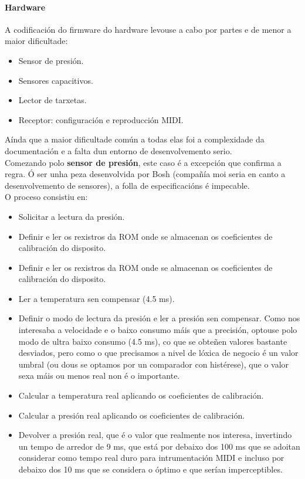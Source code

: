    \paragraph{Hardware}
   
   A codificación do firmware do hardware levouse a cabo por partes e de menor
   a maior dificultade:
   
   \begin{itemize}
    \item Sensor de presión.
    \item Sensores capacitivos.
    \item Lector de tarxetas.
    \item Receptor: configuración e reproducción MIDI.
   \end{itemize}
   
   Aínda que a maior dificultade común a todas elas foi a complexidade da
   documentación e a falta dun entorno de desenvolvemento serio. \\
   
   Comezando polo \textbf{sensor de presión}, este caso é a excepción que 
   confirma a regra. Ó ser unha peza desenvolvida por Bosh (compañía moi seria
   en canto a desenvolvemento de sensores), a folla de especificacións
   \cite{BMP085} é impecable. \\
   
    O proceso consistiu en:
    
    \begin{itemize}
    \item Solicitar a lectura da presión.
    \item Definir e ler os rexistros da ROM onde se almacenan os coeficientes de
        calibración do disposito.
    \item Definir e ler os rexistros da ROM onde se almacenan os coeficientes de
        calibración do disposito.
    \item Ler a temperatura sen compensar (4.5 ms).
    \item Definir o modo de lectura da presión e ler a presión sen compensar.
        Como nos interesaba a velocidade e o baixo consumo máis que a precisión,
        optouse polo modo de ultra baixo consumo (4.5 ms), co que se obteñen
        valores bastante desviados, pero como o que precisamos a nivel de lóxica
        de negocio é un valor umbral (ou dous se optamos por un comparador con
        histérese), que o valor sexa máis ou menos real non é o importante.
    \item Calcular a temperatura real aplicando os coeficientes de calibración.
    \item Calcular a presión real aplicando os coeficientes de calibración.
    \item Devolver a presión real, que é o valor que realmente nos interesa,
        invertindo un tempo de arredor de 9 ms, que está por debaixo dos 100 ms
        que se adoitan considerar como tempo real duro para intrumentación MIDI
        e incluso por debaixo dos 10 ms que se considera o óptimo e que serían
        imperceptibles.
   \end{itemize}
   
